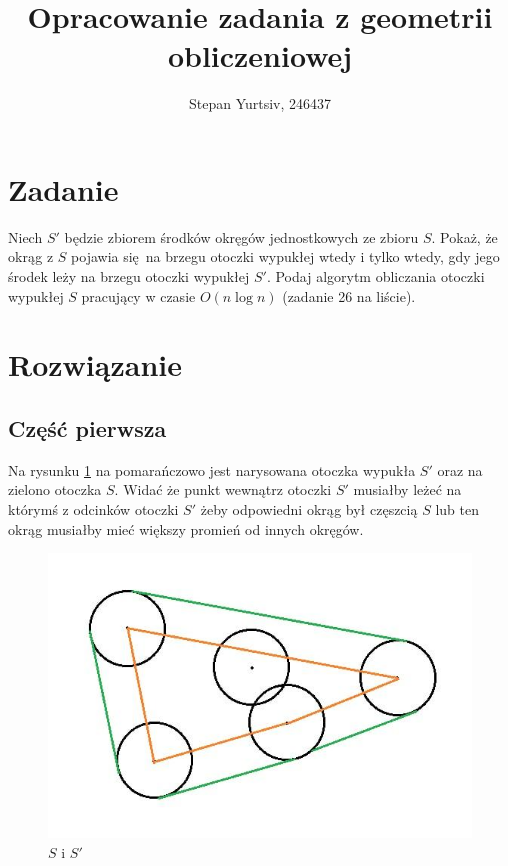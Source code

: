 \documentclass[12pt, a4paper]{article}
\title{Opracowanie zadania z geometrii obliczeniowej}
\author{Stepan Yurtsiv, 246437}
\begin{document}
\maketitle

\section*{Zadanie}

Niech $S'$ będzie zbiorem środków okręgów jednostkowych ze zbioru $S$. Pokaż, że okrąg z $S$ pojawia się na brzegu otoczki wypukłej wtedy i tylko wtedy, gdy jego środek
leży na brzegu otoczki wypukłej $S'$. Podaj algorytm obliczania otoczki wypukłej $S$ pracujący w czasie $O(n\log n)$ (zadanie 26 na liście).


\section*{Rozwiązanie}

\subsection*{Część pierwsza}

Na rysunku \ref{fig:img1} na pomarańczowo jest narysowana otoczka wypukła $S'$ oraz na zielono otoczka $S$. 
Widać że punkt wewnątrz otoczki $S'$ musiałby leżeć na którymś z odcinków otoczki $S'$ żeby odpowiedni okrąg był
częszcią $S$ lub ten okrąg musiałby mieć większy promień od innych okręgów.

\begin{figure}[H]
  \begin{center}
  \includegraphics[scale=0.65]{Img1}
  \caption{$S$ i $S'$}
  \label{fig:img1}
  \end{center}
\end{figure}
\end{document}
